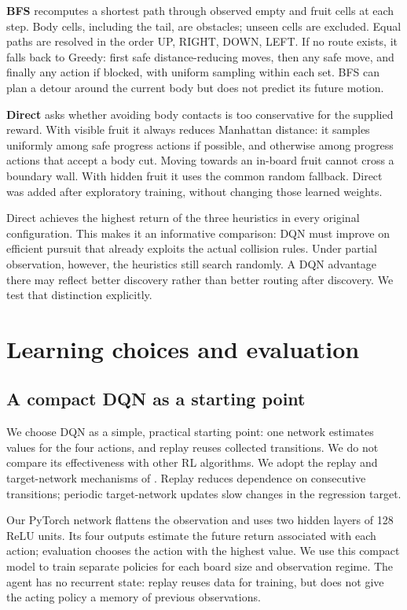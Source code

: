 \documentclass{article}
\begin{document}
\textbf{BFS} recomputes a shortest path through observed empty and fruit cells at each step. Body cells, including the tail, are obstacles; unseen cells are excluded. Equal paths are resolved in the order UP, RIGHT, DOWN, LEFT. If no route exists, it falls back to Greedy: first safe distance-reducing moves, then any safe move, and finally any action if blocked, with uniform sampling within each set. BFS can plan a detour around the current body but does not predict its future motion.

\textbf{Direct} asks whether avoiding body contacts is too conservative for the supplied reward. With visible fruit it always reduces Manhattan distance: it samples uniformly among safe progress actions if possible, and otherwise among progress actions that accept a body cut. Moving towards an in-board fruit cannot cross a boundary wall. With hidden fruit it uses the common random fallback. Direct was added after exploratory training, without changing those learned weights.

Direct achieves the highest return of the three heuristics in every original configuration. This makes it an informative comparison: DQN must improve on efficient pursuit that already exploits the actual collision rules. Under partial observation, however, the heuristics still search randomly. A DQN advantage there may reflect better discovery rather than better routing after discovery. We test that distinction explicitly.

\section{Learning choices and evaluation}
\subsection{A compact DQN as a starting point}
We choose DQN as a simple, practical starting point: one network estimates values for the four actions, and replay reuses collected transitions. We do not compare its effectiveness with other RL algorithms. We adopt the replay and target-network mechanisms of \citet[Methods, Algorithm~1]{mnih2015dqn}. Replay reduces dependence on consecutive transitions; periodic target-network updates slow changes in the regression target.

Our PyTorch network flattens the observation and uses two hidden layers of 128 ReLU units. Its four outputs estimate the future return associated with each action; evaluation chooses the action with the highest value. We use this compact model to train separate policies for each board size and observation regime. The agent has no recurrent state: replay reuses data for training, but does not give the acting policy a memory of previous observations.
\end{document}
